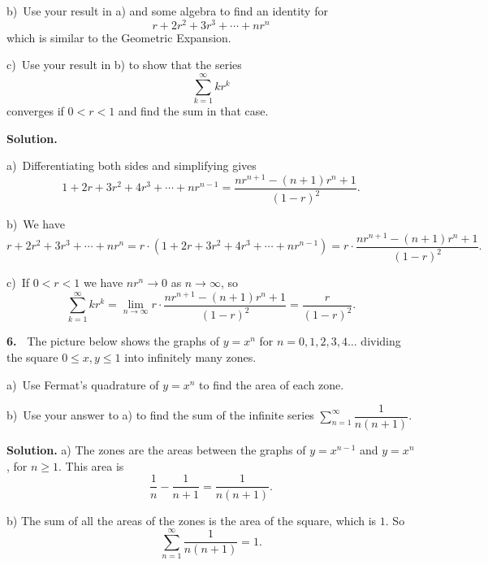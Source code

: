 \documentclass[12pt]{article}
\theoremstyle{definition}
\theoremstyle{remark}
\theoremstyle{definition}
\newenvironment{Solution}{\noindent\textbf{Solution.}}{}
\begin{document}
b)\ Use your result in a) and some algebra to find an identity for 
\[r+2r^2+3r^3+\cdots +n r^n\]
which is similar to the Geometric Expansion. 

c)\ Use your result in b) to show that the series \[\sum_{k=1}^\infty k r^k\]
converges if $0<r<1$ and find the sum in that case. 

\begin{Solution}


a)\ Differentiating both sides and simplifying gives
\[
1+2r+3r^2+4r^3+\cdots+nr^{n-1}=\frac{nr^{n+1}-(n+1)r^n+1}{(1-r)^2}.
\]



b)\ We have
\[r+2r^2+3r^3+\cdots +n r^n
=r\cdot\left(1+2r+3r^2+4r^3+\cdots+nr^{n-1}\right)
=r\cdot\frac{nr^{n+1}-(n+1)r^n+1}{(1-r)^2}.
\]

c)\ 
If $0<r<1$ we have $n r^n\to 0$ as $n\to\infty$, so 
\[\sum_{k=1}^\infty k r^k=
\lim_{n\to\infty}
r\cdot\frac{nr^{n+1}-(n+1)r^n+1}{(1-r)^2}=\frac{r}{(1-r)^2}.
\]

\end{Solution}
 
{\bf 6.\ } The picture below shows the graphs of $y=x^n$ for $n=0,1,2,3,4\dots$ dividing the square $0\leq x,y\leq 1$ into infinitely many zones. 

a)\ Use Fermat's quadrature of $y=x^n$ to find the area of each zone. 

b)\ Use your answer to a) to find the sum of the infinite series
$\sum\limits_{n=1}^\infty\dfrac{1}{n(n+1)}$. 

\begin{center}
\end{center}

\begin{Solution} a) The zones are the areas between the graphs of $y=x^{n-1}$ and $y=x^{n}$, for $n\geq 1$. This area is 
\[\frac{1}{n}-\frac{1}{n+1}=\frac{1}{n(n+1)}.\]

b) The sum of all the areas of the zones is the area of the square, which is $1$. 
So 
\[\sum_{n=1}^\infty \frac{1}{n(n+1)}=1.\]

\end{Solution}
\end{document}
